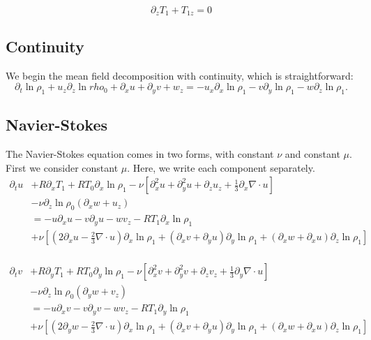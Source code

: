 \documentclass[letterpaper,12pt]{paper}
\newcommand{\lnrho}{\ensuremath{\ln \rho}}
\begin{document}
\begin{equation}
  \label{eq:aux_u}
  \partial_z T_1 + T_{1z} = 0
\end{equation}

\subsection{Continuity}
\label{sec:continuity_mfd}

We begin the mean field decomposition with continuity, which is straightforward:
\begin{equation}
  \label{eq:continuity_mfd}
  \partial_t \lnrho_1 + u_z \partial_z \ln rho_0 + \partial_x u
  + \partial_y v + w_z =
  - u_x \partial_x \lnrho_1   - v \partial_y \lnrho_1   - w \partial_z \lnrho_1.
\end{equation}

\subsection{Navier-Stokes}
\label{sec:ns_mfd}

The Navier-Stokes equation comes in two forms, with constant $\nu$ and
constant $\mu$. First we consider constant $\mu$. Here, we write each
component separately.
\begin{equation}
  \begin{aligned}
    \label{eq:ns_x_mfd}
    \partial_t u & + R \partial_x T_1 + R T_0 \partial_x \lnrho_1 - \nu
    \left[ \partial_x^2 u + \partial_y^2 u + \partial_z u_z +
      \frac{1}{3}\partial_x \nabla \cdot u \right] \\
& - \nu \partial_z \lnrho_0 \left(\partial_x w + u_z \right)  \\
    & = - u \partial_x u - v \partial_y u - w v_z - R T_1 \partial_x \lnrho_1 \\
    & + \nu \left[ \left( 2 \partial_x u - \frac{2}{3} \nabla \cdot
        u\right) \partial_x \lnrho_1 + (\partial_x v + \partial_y
      u)\partial_y \lnrho_1 + (\partial_x w + \partial_x u) \partial_z \lnrho_1 \right]\\
\end{aligned}
\end{equation}

\begin{equation}
  \begin{aligned}
    \label{eq:ns_y_mfd}
    \partial_t v & + R \partial_y T_1 + R T_0 \partial_y \lnrho_1 - \nu
    \left[ \partial_x^2 v + \partial_y^2 v + \partial_z v_z +
      \frac{1}{3} \partial_y \nabla \cdot u \right] \\
& - \nu \partial_z \lnrho_0 \left(\partial_y w + v_z \right)  \\
    & = - u \partial_x v - v \partial_y v - w v_z - R T_1 \partial_y \lnrho_1 \\
    & + \nu \left[ \left( 2 \partial_y w - \frac{2}{3} \nabla \cdot
        u\right) \partial_x \lnrho_1 + (\partial_x v + \partial_y
      u)\partial_y \lnrho_1 + (\partial_x w + \partial_x u) \partial_z \lnrho_1 \right]\\
\end{aligned}
\end{equation}
\end{document}
